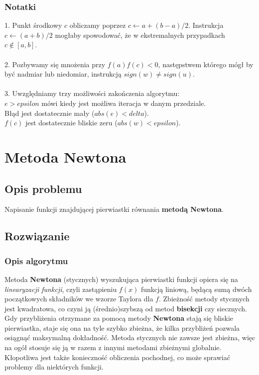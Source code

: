 \documentclass[10pt,a4paper, polish]{article}
\begin{document}
\subsubsection*{Notatki}
1. Punkt środkowy $c$ obliczamy poprzez $c \leftarrow a + (b - a)/2$. Instrukcja $c \leftarrow (a + b)/2$ mogłaby spowodować, że w ekstremalnych przypadkach $c \notin [a, b]$.\\\\
2. Pozbywamy się mnożenia przy $f(a)f(c) < 0$, następstwem którego mógł by być nadmiar lub niedomiar, instrukcją $sign(w) \neq sign(u)$.\\\\
3. Uwzględniamy trzy możliwości zakończenia algorytmu:\\
\quad $e > epsilon$ mówi kiedy jest możliwa iteracja w danym przedziale.\\
\quad Błąd jest dostatecznie mały ($abs(e) < delta$).\\
\quad $f(c)$ jest dostatecznie bliskie zeru ($abs(w) < epsilon$).

\section{Metoda Newtona}

\subsection*{Opis problemu}
Napisanie funkcji znajdującej pierwiastki równania \textbf{metodą Newtona}.
\subsection*{Rozwiązanie}
\subsubsection*{Opis algorytmu}
Metoda \textbf{Newtona} (stycznych) wyszukująca pierwiastki funkcji opiera się na \emph{linearyzacji funkcji}, czyli zastąpieniu $f(x)$ funkcją liniową, będącą sumą dwóch początkowych składników we wzorze Taylora dla $f$. Zbieżność metody stycznych jest kwadratowa, co czyni ją (średnio)szybszą od metod \textbf{bisekcji} czy siecznych. Gdy przybliżenia otrzymane za pomocą metody \textbf{Newtona} stają się bliskie pierwiastka, staje się ona na tyle szybko zbieżna, że kilka przybliżeń pozwala osiągnąć maksymalną dokładność. Metoda stycznych nie zawsze jest zbieżna, więc na ogół stosuje się ją w razem z innymi metodami zbieżnymi globalnie. Kłopotliwa jest także konieczność obliczenia pochodnej, co może sprawiać problemy dla niektórych funkcji.
\end{document}
